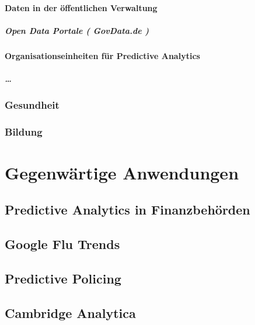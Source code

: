 \documentclass[12pt,a4paper,listof=totoc,oneside]{scrreprt}
\begin{document}
\subsubsection{Daten in der öffentlichen Verwaltung}

\paragraph{Open Data Portale ( GovData.de )}

\subsubsection{Organisationseinheiten für Predictive Analytics}

\paragraph{\ldots}

\subsection{Gesundheit}

\subsection{Bildung}

\chapter{Gegenwärtige Anwendungen}

\section{Predictive Analytics in Finanzbehörden}

\section{Google Flu Trends}

\section{Predictive Policing}

\section{Cambridge Analytica}
\end{document}
